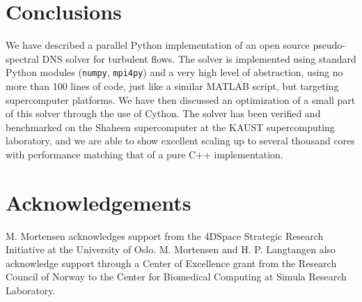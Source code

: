 \documentclass[final,1p,times]{elsarticle}
\begin{document}
\section{Conclusions}

We have described a parallel Python implementation of an open source pseudo-spectral DNS solver for turbulent flows. The solver is implemented using standard Python modules (\texttt{numpy}, \texttt{mpi4py}) and a very high level of abstraction, using no more than 100 lines of code, just like a similar MATLAB script, but targeting supercomputer platforms. We have then discussed an optimization of a small part of this solver through the use of Cython. The solver has been verified and benchmarked on the Shaheen supercomputer at the KAUST supercomputing laboratory, and we are able to show excellent scaling up to several thousand cores with performance matching that of a pure C++ implementation.

\section*{Acknowledgements}
M. Mortensen acknowledges support from the 4DSpace Strategic Research Initiative at the University of Oslo. M. Mortensen and H. P. Langtangen also acknowledge support through a Center of Excellence grant from the Research Council of Norway to the Center for Biomedical Computing at Simula Research Laboratory.



\newpage
\end{document}
